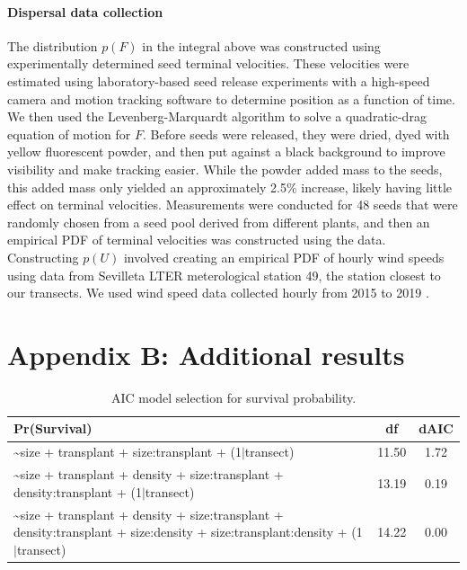 \documentclass[11pt]{article}\usepackage[]{graphicx}\usepackage[]{color}
\begin{document}
\paragraph{Dispersal data collection}
The distribution $p(F)$ in the integral above was constructed using experimentally determined seed terminal velocities.
These velocities were estimated using laboratory-based seed release experiments with a high-speed camera and motion tracking software to determine position as a function of time.
We then used the Levenberg-Marquardt algorithm to solve a quadratic-drag equation of motion for $F$. 
Before seeds were released, they were dried, dyed with yellow fluorescent powder, and then put against a black background to improve visibility and make tracking easier.
While the powder added mass to the seeds, this added mass only yielded an approximately 2.5\% increase, likely having little effect on terminal velocities.
Measurements were conducted for 48 seeds that were randomly chosen from a seed pool derived from different plants, and then an empirical PDF of terminal velocities was constructed using the data.
Constructing $p(U)$ involved creating an empirical PDF of hourly wind speeds using data from Sevilleta LTER meterological station 49, the station closest to our transects.
We used wind speed data collected hourly from 2015 to 2019 \citep{SEVmet}.

\newpage
\section*{Appendix B: Additional results}
\renewcommand{\thefigure}{B\arabic{figure}}\setcounter{figure}{0}
\renewcommand{\thetable}{B\arabic{table}}\setcounter{table}{0}
\renewcommand{\theequation}{B\arabic{equation}}\setcounter{equation}{0}

\begin{table}[ht]
\centering
\begin{tabular}{|p{12cm}|c|c|}
  \hline
Pr(Survival) & df & dAIC \\ 
  \hline
\~{}size + transplant + size:transplant + (1$|$transect) & 11.50 & 1.72 \\ 
  \~{}size + transplant + density + size:transplant + density:transplant + (1$|$transect) & 13.19 & 0.19 \\ 
  \~{}size + transplant + density + size:transplant + density:transplant + size:density + size:transplant:density + (1$|$transect) & 14.22 & 0.00 \\ 
   \hline
\end{tabular}
\caption{AIC model selection for survival probability.} 
\label{tab:surv_aic}
\end{table}
\end{document}

